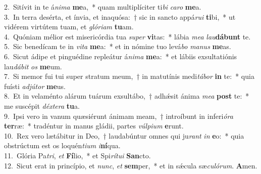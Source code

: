 {2.~}Sitívit in te á\textit{ni}\textit{ma} \textbf{me}a,~* quam multiplíciter ti\textit{bi} \textit{ca}\textit{ro} \textbf{me}a.\\
{3.~}In terra desérta, et ínvia, et inaquósa:~† sic in sancto appá\textit{ru}\textit{i} \textbf{ti}bi,~* ut vidérem virtútem tuam, et \textit{gló}\textit{ri}\textit{am} \textbf{tu}am.\\
{4.~}Quóniam mélior est misericórdia tua \textit{su}\textit{per} \textbf{vi}tas:~* lábia \textit{me}\textit{a} \textit{lau}\textbf{dá}\textbf{bunt} te.\\
{5.~}Sic benedícam te in \textit{vi}\textit{ta} \textbf{me}a:~* et in nómine tuo levá\textit{bo} \textit{ma}\textit{nus} \textbf{me}as.\\
{6.~}Sicut ádipe et pinguédine repleátur á\textit{ni}\textit{ma} \textbf{me}a:~* et lábiis exsultatiónis lau\textit{dá}\textit{bit} \textit{os} \textbf{me}um.\\
{7.~}Si memor fui tui super stratum meum,~† in matutínis medi\textit{tá}\textit{bor} \textbf{in} te:~* quia fuísti \textit{ad}\textit{jú}\textit{tor} \textbf{me}us.\\
{8.~}Et in velaménto alárum tuárum exsultábo,~† adhǽsit ánima \textit{me}\textit{a} \textbf{post} te:~* me suscépit \textit{déx}\textit{te}\textit{ra} \textbf{tu}a.\\
{9.~}Ipsi vero in vanum quæsiérunt ánimam meam,~† introíbunt in inferi\textit{ó}\textit{ra} \textbf{ter}ræ:~* tradéntur in manus gládii, partes \textit{vúl}\textit{pi}\textit{um} \textbf{e}runt.\\
{10.~}Rex vero lætábitur in Deo,~† laudabúntur omnes qui ju\textit{rant} \textit{in} \textbf{e}o:~* quia obstrúctum est os loquén\textit{ti}\textit{um} \textit{i}\textbf{ní}qua.\\
{11.~}Glória Pa\textit{tri}, \textit{et} \textbf{Fí}lio,~* et Spi\textit{rí}\textit{tu}\textit{i} \textbf{San}cto.\\
{12.~}Sicut erat in princípio, et \textit{nunc}, \textit{et} \textbf{sem}per,~* et in sǽcula sæ\textit{cu}\textit{ló}\textit{rum}. \textbf{A}men.\\
